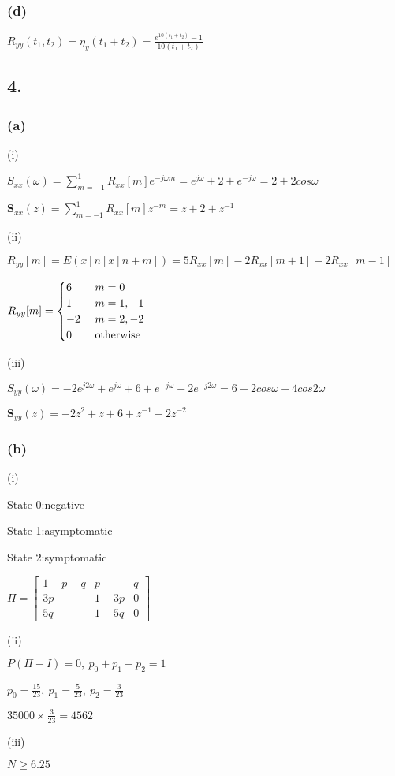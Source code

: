 \documentclass{article}
\begin{document}
\subsubsection*{(d)}
$R_{yy}(t_{1},t_{2})=\eta_{y}(t_{1}+t_{2})=\frac{{e}^{10(t_{1}+t_{2})}-1}{10(t_{1}+t_{2})}$

\subsection*{4.}
\subsubsection*{(a)}
(i)\par
$S_{xx}(\omega)=\sum_{m=-1}^{1}R_{xx}[m]e^{-j\omega m}=e^{j\omega}+2+e^{-j\omega}=2+2cos\omega$\par
$\mathbf{S}_{xx}(z)=\sum_{m=-1}^{1}R_{xx}[m]z^{-m}=z+2+z^{-1}$\par
(ii)\par
$R_{yy}[m]=E(x[n]x[n+m])=5R_{xx}[m]-2R_{xx}[m+1]-2R_{xx}[m-1]$\par
$R_{yy}[m]=\begin{cases}
6 \ &m=0\\
1 \ &m=1,-1\\
-2 \ &m=2,-2\\
0 \ &{\rm otherwise}
\end{cases}$\par\indent
\par
(iii)\par
$S_{yy}(\omega)=-2e^{j2\omega}+e^{j\omega}+6+e^{-j\omega}-2e^{-j2\omega}=6+2cos\omega-4cos2\omega$\par
$\mathbf{S}_{yy}(z)=-2z^{2}+z+6+z^{-1}-2z^{-2}$\par

\subsubsection*{(b)}
(i)\par
State 0:negative\par
State 1:asymptomatic\par
State 2:symptomatic\par

$\Pi=\begin{bmatrix}
1-p-q & p &q\\
3p & 1-3p & 0\\
5q & 1-5q & 0
\end{bmatrix}$\par
(ii)\par
$P(\Pi-I)=0, \ p_{0}+p_{1}+p_{2}=1$\par
$p_{0}=\frac{15}{23}, \ p_{1}=\frac{5}{23}, \ p_{2}=\frac{3}{23}$\par
$35000 \times \frac{3}{23}=4562$\par
(iii)\par
$N \geq 6.25$
\end{document}
